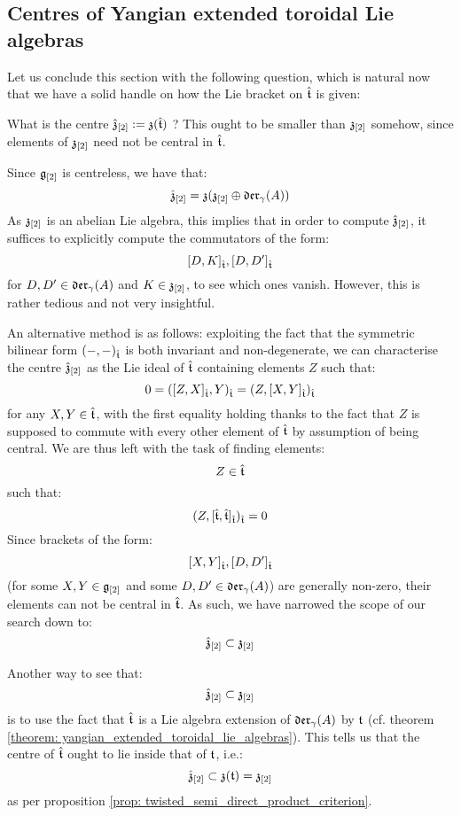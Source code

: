     \subsection{Centres of Yangian extended toroidal Lie algebras}
        Let us conclude this section with the following question, which is natural now that we have a solid handle on how the Lie bracket on $\hat{\mathfrak{t}}$ is given:
        \begin{question}
            What is the centre $\hat{\mathfrak{z}}_{[2]} := \mathfrak{z}( \hat{\mathfrak{t}} )$ ? This ought to be smaller than $\mathfrak{z}_{[2]}$ somehow, since elements of $\mathfrak{z}_{[2]}$ need not be central in $\hat{\mathfrak{t}}$. 
        \end{question}
        \begin{remark}
            Since $\mathfrak{g}_{[2]}$ is centreless, we have that:
                $$\hat{\mathfrak{z}}_{[2]} = \mathfrak{z}( \mathfrak{z}_{[2]} \oplus \mathfrak{der}_{\gamma}(A) )$$
            As $\mathfrak{z}_{[2]}$ is an abelian Lie algebra, this implies that in order to compute $\hat{\mathfrak{z}}_{[2]}$, it suffices to explicitly compute the commutators of the form:
                $$[D, K]_{\hat{\mathfrak{t}}}, [D, D']_{\hat{\mathfrak{t}}}$$
            for $D, D' \in \mathfrak{der}_{\gamma}(A)$ and $K \in \mathfrak{z}_{[2]}$, to see which ones vanish. However, this is rather tedious and not very insightful.
            
            An alternative method is as follows: exploiting the fact that the symmetric bilinear form $(-, -)_{\hat{\mathfrak{t}}}$ is both invariant and non-degenerate, we can characterise the centre $\hat{\mathfrak{z}}_{[2]}$ as the Lie ideal of $\hat{\mathfrak{t}}$ containing elements $Z$ such that:
                $$0 = ([Z, X]_{\hat{\mathfrak{t}}}, Y)_{\hat{\mathfrak{t}}} = (Z, [X, Y]_{\hat{\mathfrak{t}}})_{\hat{\mathfrak{t}}}$$
            for any $X, Y \in \hat{\mathfrak{t}}$, with the first equality holding thanks to the fact that $Z$ is supposed to commute with every other element of $\hat{\mathfrak{t}}$ by assumption of being central. We are thus left with the task of finding elements:
                $$Z \in \hat{\mathfrak{t}}$$
            such that:
                $$(Z, [\hat{\mathfrak{t}}, \hat{\mathfrak{t}}]_{\hat{\mathfrak{t}}})_{\hat{\mathfrak{t}}} = 0$$
            Since brackets of the form:
                $$[X, Y]_{\hat{\mathfrak{t}}}, [D, D']_{\hat{\mathfrak{t}}}$$
            (for some $X, Y \in \mathfrak{g}_{[2]}$ and some $D, D' \in \mathfrak{der}_{\gamma}(A)$) are generally non-zero, their elements can not be central in $\hat{\mathfrak{t}}$. As such, we have narrowed the scope of our search down to:
                $$\hat{\mathfrak{z}}_{[2]} \subset \mathfrak{z}_{[2]}$$

            Another way to see that:
                $$\hat{\mathfrak{z}}_{[2]} \subset \mathfrak{z}_{[2]}$$
            is to use the fact that $\hat{\mathfrak{t}}$ is a Lie algebra extension of $\mathfrak{der}_{\gamma}(A)$ by $\mathfrak{t}$ (cf. theorem \ref{theorem: yangian_extended_toroidal_lie_algebras}). This tells us that the centre of $\hat{\mathfrak{t}}$ ought to lie inside that of $\mathfrak{t}$, i.e.:
                $$\hat{\mathfrak{z}}_{[2]} \subset \mathfrak{z}(\mathfrak{t}) = \mathfrak{z}_{[2]}$$
            as per proposition \ref{prop: twisted_semi_direct_product_criterion}.
        \end{remark}
